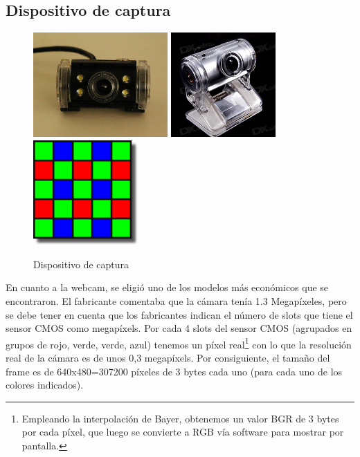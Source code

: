 \label{sec:capture_device}
\subsection{Dispositivo de captura}

\begin{figure}[h!]
        \centering
	\includegraphics[height=4cm]{imagenes/camara_empleada.jpg}
	\includegraphics[height=4cm]{imagenes/camara_actual.jpg}
	\includegraphics[height=4cm]{imagenes/bayer_mosaic.png}
        \caption{Dispositivo de captura}
	\label{fig:webcam}
\end{figure}

En cuanto a la webcam, se eligió uno de los modelos más económicos que se encontraron. El fabricante comentaba que la cámara tenía 1.3 Megapíxeles, pero se debe tener en cuenta que los fabricantes indican el número de slots que tiene el sensor CMOS como megapíxels. Por cada 4 slots del sensor CMOS (agrupados en grupos de rojo, verde, verde, azul) tenemos un píxel real\footnote{Empleando la interpolación de Bayer, obtenemos un valor BGR de 3 bytes por cada píxel, que luego se convierte a RGB vía software para mostrar por pantalla.} con lo que la resolución real de la cámara es de unos 0,3 megapíxels. Por consiguiente, el tamaño del frame es de 640x480=307200 píxeles de 3 bytes cada uno (para cada uno de los colores indicados). 

